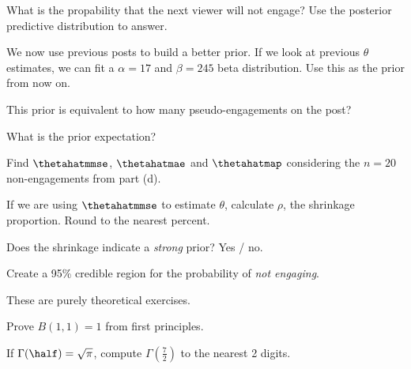 \documentclass[12pt]{article}
\begin{document}
 What is the propability that the next viewer will not engage? Use the posterior predictive distribution to answer.

We now use previous posts to build a better prior. If we look at previous $\theta$ estimates, we can fit a $\alpha=17$ and $\beta=245$ beta distribution. Use this as the prior from now on.

 This prior is equivalent to how many pseudo-engagements on the post? 

 What is the prior expectation? 

 Find $\thetahatmmse$, $\thetahatmae$ and $\thetahatmap$ considering the $n=20$ non-engagements from part (d). 

 If we are using $\thetahatmmse$ to estimate $\theta$, calculate $\rho$, the shrinkage proportion. Round to the nearest percent. 


 Does the shrinkage indicate a \emph{strong} prior? Yes / no. 

 Create a 95\% credible region for the probability of \emph{not engaging}. 

\eenum

\problem These are purely theoretical exercises.

\benum


 Prove $B(1,1) = 1$ from first principles. 

 If $\Gamma(\half) = \sqrt{\pi}$, compute $\Gamma(\frac{7}{2})$ to the nearest 2 digits. 
\eenum
\end{document}

